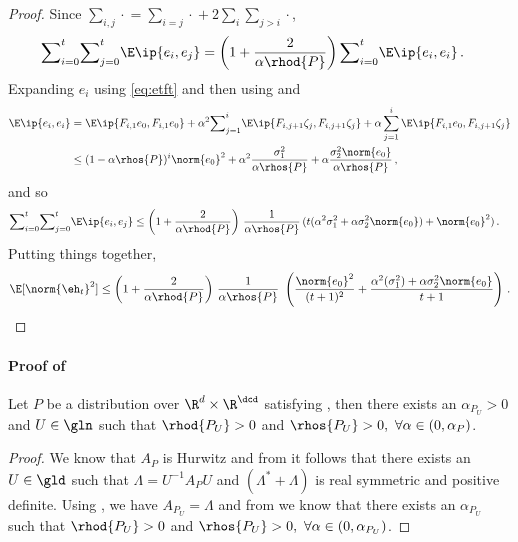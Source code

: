 \begin{proof}
Since $\sum_{i,j}\cdot{} = \sum_{i=j}\cdot{} + 2 \sum_i \sum_{j>i} \cdot{}$,
\begin{align*}
{\sum}_{i=0}^{t}{\sum}_{j=0}^{t} \E\ip{e_i,e_j}&= \left(1+\frac2{\alpha\rhod{P}}\right){\sum}_{i=0}^{t}\E\ip{e_i,e_i}\,.
\end{align*}
Expanding $e_i$ using \eqref{eq:etft} and then using  and 
\begin{align*}
\E\ip{e_i,e_i}&=\E\ip{F_{i,1}e_0,F_{i,1}e_0}+\alpha^2{\sum}_{j=1}^i\E\ip{ F_{i,j+1}\zeta_j, F_{i,j+1}\zeta_j}+\alpha\sum_{j=1}^i  \E\ip{F_{i,1} e_0, F_{i,j+1}\zeta_j}\\
&\leq (1-\alpha\rhos{P})^i\norm{e_0}^2+ \alpha^2\frac{{\sigma}_1^2}{\alpha \rhos{P}}+ \alpha \frac{{\sigma}^2_2 \norm{e_0}}{\alpha\rhos{P}}\,,
\end{align*}
and so
\begin{align*}
{\sum}_{i=0}^{t}{\sum}_{j=0}^{t} \E\ip{e_i,e_j}
&\leq \left(1+\frac2{\alpha\rhod{P} }\right)\, \frac1{\alpha\rhos{P}}\, (t(\alpha^2{\sigma}_1^2+\alpha {\sigma}^2_2\norm{e_0}) +\norm{e_0}^2)\,.
\end{align*}
Putting things together,
\begin{align}
\E[\norm{\eh_t}^2]
\leq \left(1+\frac2{\alpha\rhod{P}}\right)\, \frac1{\alpha\rhos{P}}\, \,
\left(\frac{\norm{e_0}^2}{(t+1)^2}+ \frac{\alpha^2(\sigma_1^2)+\alpha \sigma_2^2\norm{e_0}}{t+1} \right)\,.
\end{align}
\end{proof}

\paragraph{Proof of }
\begin{lemma} %
Let $P$ be a distribution over $\R^d\times \R^{\dcd}$ satisfying , then there exists an $\alpha_{P_U}>0$ and $U\in \gln$ such that $\rhod{P_U}>0$ and $\rhos{P_U}>0,~\forall \alpha \in (0,\alpha_P)$.
\end{lemma}
\begin{proof}
We know that $A_P$ is Hurwitz and from   it follows that there exists an $U\in \gld$ such that  $\Lambda=U^{-1} A_P U$ and $(\Lambda^*+\Lambda)$ is real symmetric and positive definite. Using , we have $A_{P_U}=\Lambda$ and from  we know that there exists an $\alpha_{P_U}$ such that $\rhod{P_U}>0$ and $\rhos{P_U}>0,~\forall \alpha \in (0,\alpha_{P_U})$.

\end{proof}



